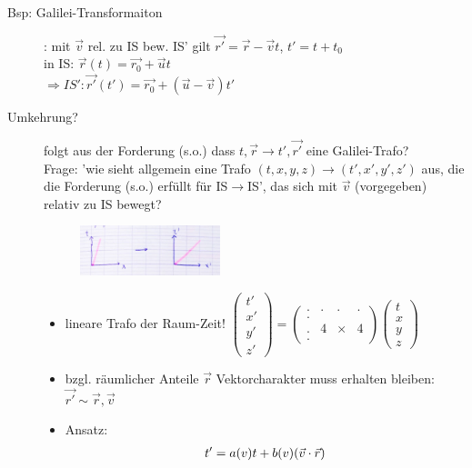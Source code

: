 \begin{description}
\item[Bsp: Galilei-Transformaiton]: mit $\vec{v}$ rel. zu IS bew. IS' gilt $\vec{r'}=\vec{r}-\vec{v}t$, $t'=t+t_0$\\
  in IS: $\vec{r}(t)=\vec{r_0}+\vec{u}t$\\
  $\Rightarrow IS': \vec{r'}(t')=\vec{r_0}+(\vec{u}-\vec{v})t'$\\
\item[Umkehrung?] folgt aus der Forderung (s.o.) dass $t,\vec{r}\rightarrow t',\vec{r'}$ eine Galilei-Trafo?\\
  Frage: 'wie sieht allgemein eine Trafo
  $(t,x,y,z)\rightarrow(t',x',y',z')$ aus, die die Forderung (s.o.)
  erfüllt für IS$\rightarrow$IS', das sich mit $\vec{v}$ (vorgegeben)
  relativ zu IS bewegt?
\begin{figure}[h]
\begin{center}
\includegraphics[width=0.4\textwidth]{Skizzen/Anhang4.jpg}
\end{center}
\caption{}
\end{figure}
\begin{itemize}
\item lineare Trafo der Raum-Zeit! $\begin{pmatrix}
t'\\
x'\\
y'\\
z'
\end{pmatrix}
=\begin{pmatrix}
. & . & . & . \\
.\\
. & 4 & \times & 4\\
.
\end{pmatrix}
\begin{pmatrix}
t\\
x\\
y\\
z
\end{pmatrix}
$
\item bzgl. räumlicher Anteile $\vec{r}$ Vektorcharakter muss erhalten bleiben: $\vec{r'}\sim\vec{r},\vec{v}$
\item Ansatz:
  \begin{align*}
t'=a	(v)			t+b(v) 			(\vec{v}\D \vec{r})\\

\end{align*}
\end{itemize}
\end{description}
